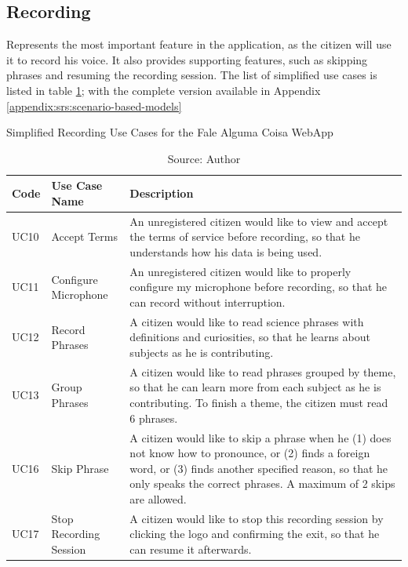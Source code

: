 \subsection{Recording}

Represents the most important feature in the application, as the citizen will use it to record his voice. It also provides supporting features, such as skipping phrases and resuming the recording session. The list of simplified use cases is listed in table \ref{tab:falealgumacoisa-simplified-recording}; with the complete version available in Appendix \ref{appendix:srs:scenario-based-models}

\begin{table}[h]
\caption{Simplified Recording Use Cases for the Fale Alguma Coisa WebApp}
\label{tab:falealgumacoisa-simplified-recording}
\centering
\begin{tabular}{|p{1cm}|p{3cm}|p{10cm}|}
\hline
    Code & Use Case Name & Description \\ \hline
    UC10 & Accept Terms & An unregistered citizen would like to view and accept the terms of service before recording, so that he understands how his data is being used. \\ \hline
    UC11 & Configure Microphone & An unregistered citizen would like to properly configure my microphone before recording, so that he can record without interruption. \\ \hline
    UC12 & Record Phrases & A citizen would like to read science phrases with definitions and curiosities, so that he learns about subjects as he is contributing. \\ \hline
    UC13 & Group Phrases & A citizen would like to read phrases grouped by theme, so that he can learn more from each subject as he is contributing. To finish a theme, the citizen must read 6 phrases. \\ \hline
    UC16 & Skip Phrase & A citizen would like to skip a phrase when he (1) does not know how to pronounce, or (2) finds a foreign word, or (3) finds another specified reason, so that he only speaks the correct phrases. A maximum of 2 skips are allowed. \\ \hline
    UC17 & Stop Recording Session & A citizen would like to stop this recording session by clicking the logo and confirming the exit, so that he can resume it afterwards. \\ \hline
\end{tabular}
\caption*{Source: Author}
\end{table}

